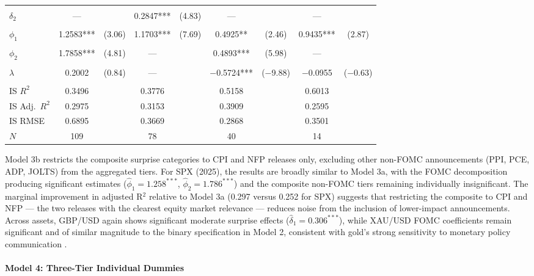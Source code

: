 \documentclass[12pt,a4paper]{report}
\begin{document}
\begin{table}[H]
{\begin{tabular}{lcccccccc}
               & & & & & & & & \\
$\delta_2$     & --- & & 0.2847*** & (4.83) & --- & & --- & \\
               & & & & & & & & \\
$\phi_1$       & 1.2583*** & (3.06) & 1.1703*** & (7.69) & 0.4925** & (2.46) & 0.9435*** & (2.87) \\
               & & & & & & & & \\
$\phi_2$       & 1.7858*** & (4.81) & --- & & 0.4893*** & (5.98) & --- & \\
               & & & & & & & & \\
$\lambda$      & 0.2002 & (0.84) & --- & & $-$0.5724*** & ($-$9.88) & $-$0.0955 & ($-$0.63) \\
               & & & & & & & & \\
\midrule
IS $R^2$       & 0.3496 & & 0.3776 & & 0.5158 & & 0.6013 & \\
IS Adj.\ $R^2$ & 0.2975 & & 0.3153 & & 0.3909 & & 0.2595 & \\
IS RMSE        & 0.6895 & & 0.3669 & & 0.2868 & & 0.3501 & \\
$N$            & 109 & & 78 & & 40 & & 14 & \\
\bottomrule
\end{tabular}
}
\end{table}

Model 3b restricts the composite surprise categories to CPI and NFP releases only, excluding other non-FOMC announcements (PPI, PCE, ADP, JOLTS) from the aggregated tiers. For SPX (2025), the results are broadly similar to Model 3a, with the FOMC decomposition producing significant estimates ($\hat{\phi}_1 = 1.258^{***}$, $\hat{\phi}_2 = 1.786^{***}$) and the composite non-FOMC tiers remaining individually insignificant. The marginal improvement in adjusted R$^2$ relative to Model 3a (0.297 versus 0.252 for SPX) suggests that restricting the composite to CPI and NFP --- the two releases with the clearest equity market relevance --- reduces noise from the inclusion of lower-impact announcements. Across assets, GBP/USD again shows significant moderate surprise effects ($\hat{\delta}_1 = 0.306^{***}$), while XAU/USD FOMC coefficients remain significant and of similar magnitude to the binary specification in Model 2, consistent with gold's strong sensitivity to monetary policy communication \citep{Baur2010}.

\paragraph{Model 4: Three-Tier Individual Dummies}\mbox{}\\
\end{document}
